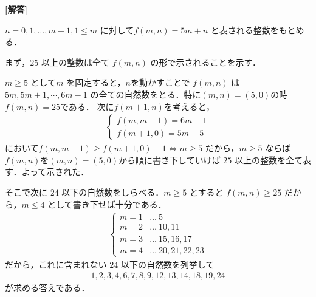 \documentclass[../../main.tex]{subfiles}
\begin{document}
\begin{oframed}
  
\end{oframed}

{\bf [解答]}

$n = 0, 1, \dots, m-1, 1 \le m$ に対して$f(m,n) = 5m + n$ と表される整数をもとめる．

まず，$25$ 以上の整数は全て $f(m,n)$ の形で示されることを示す．

$m \ge 5$ として$m$ を固定すると，$n$を動かすことで
$f(m,n)$ は $5m, 5m+1, \cdots, 6m-1$ の全ての自然数をとる．特に$(m,n)=(5,0)$の時
$f(m,n)=25$である．
次に$f(m+1,n)$を考えると，
\begin{align}
  \begin{cases}
    f(m, m-1) = 6m - 1 \\
    f(m+1, 0) = 5m + 5
  \end{cases}
\end{align}
において$f(m, m-1) \ge f(m+1, 0) - 1 \iff m \ge 5$ だから，$m \ge 5$ ならば$f(m,n)$を$(m,n)=(5,0)$から順に書き下していけば $25$ 以上の整数を全て表す．よって示された．

そこで次に $24$ 以下の自然数をしらべる．$m \ge 5$ とすると $f(m,n) \ge 25$ だから，$m \le 4$ として書き下せば十分である．
\begin{align}
  \begin{cases}
    m = 1 & \dots \ 5 \\
    m = 2 & \dots \ 10, 11 \\
    m = 3 & \dots \ 15, 16, 17 \\
    m = 4 & \dots \ 20, 21, 22, 23
  \end{cases}
\end{align}
だから，これに含まれない $24$ 以下の自然数を列挙して
\begin{align}
  1, 2, 3, 4, 6, 7, 8, 9, 12, 13, 14, 18, 19, 24
\end{align}
が求める答えである．

\newpage
\end{document}
